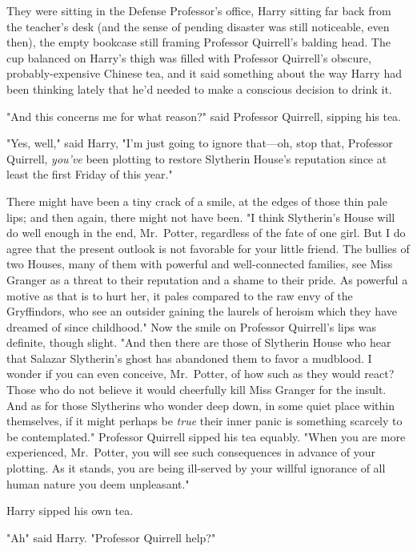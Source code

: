They were sitting in the Defense Professor's office, Harry sitting far back
from the teacher's desk (and the sense of pending disaster was still
noticeable, even then), the empty bookcase still framing Professor Quirrell's
balding head. The cup balanced on Harry's thigh was filled with Professor
Quirrell's obscure, probably-expensive Chinese tea, and it said something about
the way Harry had been thinking lately that he'd needed to make a conscious
decision to drink it.

"And this concerns me for what reason?" said Professor Quirrell, sipping his
tea.

"Yes, well," said Harry, "I'm just going to ignore that—oh, stop that,
Professor Quirrell, \emph{you've} been plotting to restore Slytherin House's
reputation since at least the first Friday of this year."

There might have been a tiny crack of a smile, at the edges of those thin pale
lips; and then again, there might not have been. "I think Slytherin's House
will do well enough in the end, Mr.~Potter, regardless of the fate of one girl.
But I do agree that the present outlook is not favorable for your little
friend. The bullies of two Houses, many of them with powerful and
well-connected families, see Miss Granger as a threat to their reputation and a
shame to their pride. As powerful a motive as that is to hurt her, it pales
compared to the raw envy of the Gryffindors, who see an outsider gaining the
laurels of heroism which they have dreamed of since childhood." Now the smile
on Professor Quirrell's lips was definite, though slight. "And then there are
those of Slytherin House who hear that Salazar Slytherin's ghost has abandoned
them to favor a mudblood. I wonder if you can even conceive, Mr.~Potter, of how
such as they would react? Those who do not believe it would cheerfully kill
Miss Granger for the insult. And as for those Slytherins who wonder deep down,
in some quiet place within themselves, if it might perhaps be
\emph{true{\el}} their inner panic is something scarcely to be
contemplated." Professor Quirrell sipped his tea equably. "When you are more
experienced, Mr.~Potter, you will see such consequences in advance of your
plotting. As it stands, you are being ill-served by your willful ignorance of
all human nature you deem unpleasant."

Harry sipped his own tea.

"Ah{\el}" said Harry. "Professor Quirrell{\el} help?"

